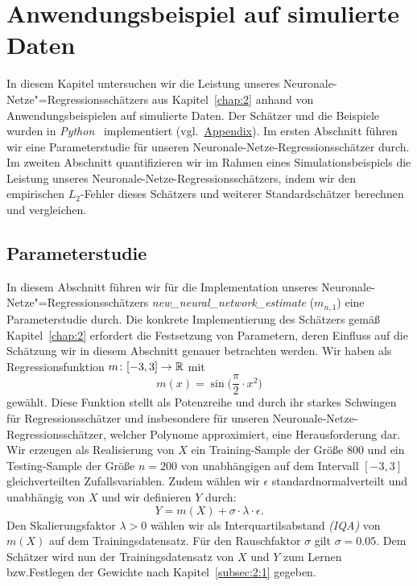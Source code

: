 \chapter{Anwendungsbeispiel auf simulierte Daten}
\label{chap:4}

In diesem Kapitel untersuchen wir die Leistung unseres Neuronale-Netze"=Regressionsschätzers aus Kapitel~\ref{chap:2} anhand von Anwendungsbeispielen auf simulierte Daten. Der Schätzer und die Beispiele wurden in \emph{Python}~\cite[Version 3.7.3]{van1995python} implementiert (vgl.~\hyperref[chap:app]{Appendix}). 
Im ersten Abschnitt führen wir eine Parameterstudie für unseren Neuronale-Netze-Regressionsschätzer durch. Im zweiten Abschnitt quantifizieren wir im Rahmen eines Simulationsbeispiels die Leistung unseres Neuronale-Netze-Regressionsschätzers, indem wir den empirischen $L_2$-Fehler dieses Schätzers und weiterer Standardschätzer berechnen und vergleichen.

\section{Parameterstudie}
\label{Studie}

In diesem Abschnitt führen wir für die Implementation unseres Neuronale-Netze"=Regressionsschätzers \textit{new\_neural\_network\_estimate} ($m_{n,1}$) eine Parameterstudie durch. Die konkrete Implementierung des Schätzers gemäß Kapitel~\ref{chap:2} erfordert die Festsetzung von Parametern, deren Einfluss auf die Schätzung wir in diesem Abschnitt genauer betrachten werden. Wir haben als Regressionsfunktion $m\colon [-3,3] \to \mathbb{R}$ mit
$$m(x) = \sin\big(\frac{\pi}{2} \cdot x^2\big)$$
gewählt.
Diese Funktion stellt als Potenzreihe und durch ihr starkes Schwingen für Regressionsschätzer und insbesondere für unseren Neuronale-Netze-Regressionsschätzer, welcher Polynome approximiert, eine Herausforderung dar. Wir erzeugen als Realisierung von $X$ ein Training-Sample der Größe $800$ und ein Testing-Sample der Größe $n = 200$ von unabhängigen auf dem Intervall $[-3,3]$ gleichverteilten Zufallsvariablen. Zudem wählen wir $\epsilon$ standardnormalverteilt und unabhängig von $X$ und wir definieren $Y$ durch:
\begin{equation}
    \label{eq:Y}
    Y = m(X) + \sigma \cdot \lambda \cdot \epsilon.
\end{equation}
Den Skalierungsfaktor $\lambda > 0$ wählen wir als Interquartilsabstand \emph{(IQA)} von $m(X)$ auf dem Trainingsdatensatz. Für den Rauschfaktor $\sigma$ gilt $\sigma = 0.05.$
Dem Schätzer wird nun der Trainingsdatensatz von $X$ und $Y$ zum Lernen bzw.\@ Festlegen der Gewichte nach Kapitel~\ref{subsec:2:1} gegeben. 

